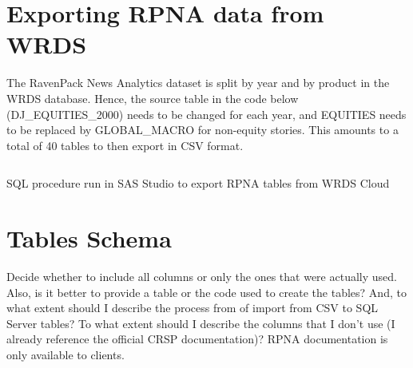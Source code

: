 \section{Exporting RPNA data from WRDS}

The RavenPack News Analytics dataset is split by year and by product in the WRDS database. Hence, the source table in the code below (DJ\_EQUITIES\_2000) needs to be changed for each year, and EQUITIES needs to be replaced by GLOBAL\_MACRO for non-equity stories. This amounts to a total of 40 tables to then export in CSV format.

\begin{listing}[ht]
\inputminted[frame=lines, linenos]{sas}{code/RPNA_export.txt}
\caption{SQL procedure run in SAS Studio to export RPNA tables from WRDS Cloud}
\label{snippet:RPNA}
\end{listing}

\section{Tables Schema}

Decide whether to include all columns or only the ones that were actually used. Also, is it better to provide a table or the code used to create the tables? And, to what extent should I describe the process from of import from CSV to SQL Server tables? To what extent should I describe the columns that I don't use (I already reference the official CRSP documentation)? RPNA documentation is only available to clients. 

%
